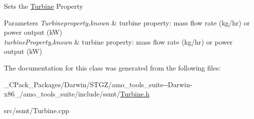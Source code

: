 Sets the \hyperlink{class_turbine}{Turbine} Property


\begin{DoxyParams}{Parameters}
{\em Turbineproperty,known} & turbine property\+: mass flow rate (kg/hr) or power output (kW) \\
\hline
{\em turbine\+Property,known} & turbine property\+: mass flow rate (kg/hr) or power output (kW) \\
\hline
\end{DoxyParams}


The documentation for this class was generated from the following files\+:\begin{DoxyCompactItemize}
\item 
\+\_\+\+C\+Pack\+\_\+\+Packages/\+Darwin/\+S\+T\+G\+Z/amo\+\_\+tools\+\_\+suite-\/-\/\+Darwin-\/x86\+\_/amo\+\_\+tools\+\_\+suite/include/ssmt/\hyperlink{___c_pack___packages_2_darwin_2_s_t_g_z_2amo__tools__suite--_darwin-x86__64_2amo__tools__suite_2include_2ssmt_2_turbine_8h}{Turbine.\+h}\item 
src/ssmt/Turbine.\+cpp\end{DoxyCompactItemize}
